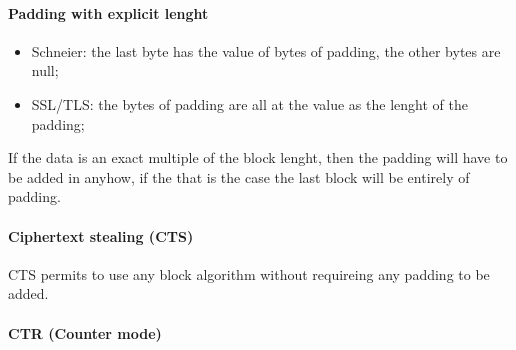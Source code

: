 \documentclass[12pt]{article}
\begin{document}
\paragraph{Padding with explicit lenght}
\begin{itemize}
    \item Schneier: the last byte has the value of bytes of padding, the other bytes are null;
    \item SSL/TLS: the bytes of padding are all at the value as the lenght of the padding;
\end{itemize}
If the data is an exact multiple of the block lenght, then the padding will have to be added in anyhow, if the that is the case the last block will be entirely of padding.

\paragraph{Ciphertext stealing (CTS)}
CTS permits to use any block algorithm without requireing any padding to be added.

\paragraph{CTR (Counter mode)}
\end{document}
